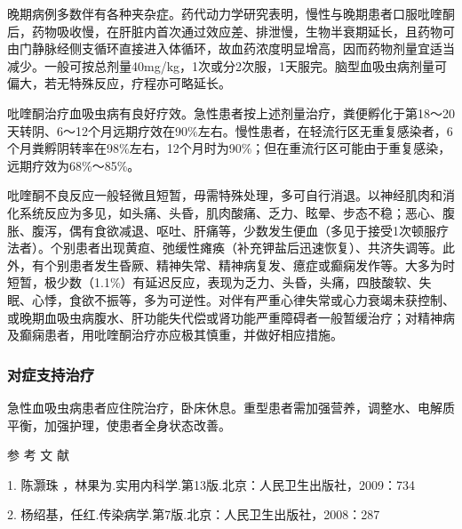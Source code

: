 晚期病例多数伴有各种夹杂症。药代动力学研究表明，慢性与晚期患者口服吡喹酮后，药物吸收慢，在肝脏内首次通过效应差、排泄慢，生物半衰期延长，且药物可由门静脉经侧支循环直接进入体循环，故血药浓度明显增高，因而药物剂量宜适当减少。一般可按总剂量40mg/kg，1次或分2次服，1天服完。脑型血吸虫病剂量可偏大，若无特殊反应，疗程亦可略延长。

吡喹酮治疗血吸虫病有良好疗效。急性患者按上述剂量治疗，粪便孵化于第18～20天转阴、6～12个月远期疗效在90\%左右。慢性患者，在轻流行区无重复感染者，6个月粪孵阴转率在98\%左右，12个月时为90\%；但在重流行区可能由于重复感染，远期疗效为68\%～85\%。

吡喹酮不良反应一般轻微且短暂，毋需特殊处理，多可自行消退。以神经肌肉和消化系统反应为多见，如头痛、头昏，肌肉酸痛、乏力、眩晕、步态不稳；恶心、腹胀、腹泻，偶有食欲减退、呕吐、肝痛等，少数发生便血（多见于接受1次顿服疗法者）。个别患者出现黄疸、弛缓性瘫痪（补充钾盐后迅速恢复）、共济失调等。此外，有个别患者发生昏厥、精神失常、精神病复发、癔症或癫痫发作等。大多为时短暂，极少数（1.1\%）有延迟反应，表现为乏力、头昏，头痛，四肢酸软、失眠、心悸，食欲不振等，多为可逆性。对伴有严重心律失常或心力衰竭未获控制、或晚期血吸虫病腹水、肝功能失代偿或肾功能严重障碍者一般暂缓治疗；对精神病及癫痫患者，用吡喹酮治疗亦应极其慎重，并做好相应措施。

\subsubsection{对症支持治疗}

急性血吸虫病患者应住院治疗，卧床休息。重型患者需加强营养，调整水、电解质平衡，加强护理，使患者全身状态改善。

\protect\hypertarget{text00240.html}{}{}

\hypertarget{text00240.htmlux5cux23CHP7-15-4}{}
参 考 文 献

1. 陈灏珠 ，林果为.实用内科学.第13版.北京：人民卫生出版社，2009：734

2. 杨绍基，任红.传染病学.第7版.北京：人民卫生出版社，2008：287

\protect\hypertarget{text00241.html}{}{}

